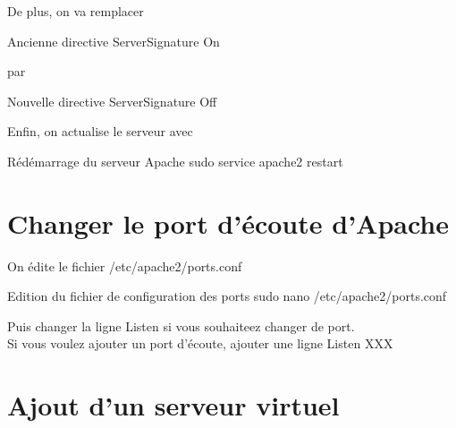 De plus, on va remplacer 

\begin{Bash}{Ancienne directive}
ServerSignature On
\end{Bash}
par
\begin{Bash}{Nouvelle directive}
ServerSignature Off
\end{Bash}



Enfin, on actualise le serveur avec

\begin{Bash}{Rédémarrage du serveur Apache}
sudo service apache2 restart
\end{Bash}

\section{Changer le port d'écoute d'Apache}

On édite le fichier /etc/apache2/ports.conf

\begin{Bash}{Edition du fichier de configuration des ports}
sudo nano /etc/apache2/ports.conf
\end{Bash}
Puis changer la ligne Listen si vous souhaiteez changer de port.\\
Si vous voulez ajouter un port d'écoute, ajouter une ligne Listen XXX


\section{Ajout d'un serveur virtuel}

